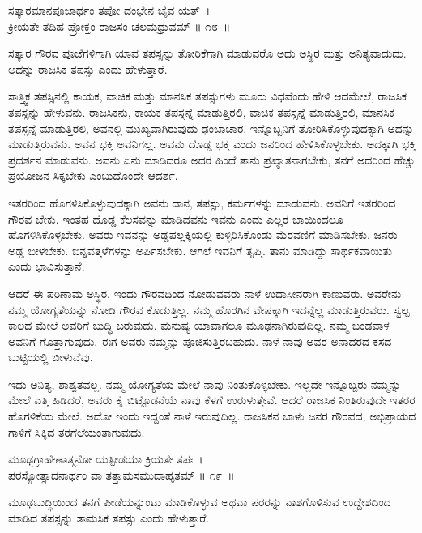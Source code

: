 \begin{shloka}
ಸತ್ಕಾರಮಾನಪೂಜಾರ್ಥಂ ತಪೋ ದಂಭೇನ ಚೈವ ಯತ್~।\\ಕ್ರೀಯತೇ ತದಿಹ ಪ್ರೋಕ್ತಂ ರಾಜಸಂ ಚಲಮಧ್ರುವಮ್ \hfill॥ ೧೮~॥
\end{shloka}

\begin{artha}
ಸತ್ಕಾರ ಗೌರವ ಪೂಜೆಗಳಿಗಾಗಿ ಯಾವ ತಪಸ್ಸನ್ನು ತೋರಿಕೆಗಾಗಿ ಮಾಡುವರೊ ಅದು ಅಸ್ಥಿರ ಮತ್ತು ಅನಿತ್ಯವಾದುದು. ಅದನ್ನು ರಾಜಸಿಕ ತಪಸ್ಸು ಎಂದು ಹೇಳುತ್ತಾರೆ.
\end{artha}

ಸಾತ್ತ್ವಿಕ ತಪಸ್ಸಿನಲ್ಲಿ ಕಾಯಕ, ವಾಚಿಕ ಮತ್ತು ಮಾನಸಿಕ ತಪಸ್ಸುಗಳು ಮೂರು ವಿಧವೆಂದು ಹೇಳಿ ಆದಮೇಲೆ, ರಾಜಸಿಕ ತಪಸ್ಸನ್ನು ಹೇಳುವನು. ರಾಜಸಿಕನು, ಕಾಯಕ ತಪಸ್ಸನ್ನೆ ಮಾಡುತ್ತಿರಲಿ, ವಾಚಿಕ ತಪಸ್ಸನ್ನೆ ಮಾಡುತ್ತಿರಲಿ, ಮಾನಸಿಕ ತಪಸ್ಸನ್ನೆ ಮಾಡುತ್ತಿರಲಿ, ಅವನಲ್ಲಿ ಮುಖ್ಯವಾಗಿರುವುದು ಢಂಬಾಚಾರ. ಇನ್ನೊಬ್ಬನಿಗೆ ತೋರಿಸಿಕೊಳ್ಳುವುದಕ್ಕಾಗಿ ಅದನ್ನು ಮಾಡು\-ತ್ತಿರುವನು. ಅವನ ಭಕ್ತಿ ಅವನಿಗಲ್ಲ. ಅವನು ದೊಡ್ಡ ಭಕ್ತ ಎಂದು ಜನರಿಂದ ಹೇಳಿಸಿಕೊಳ್ಳಬೇಕು. ಅದಕ್ಕಾಗಿ ಭಕ್ತಿ ಪ್ರದರ್ಶನ ಮಾಡುವನು. ಅವನು ಏನು ಮಾಡಿದರೂ ಅದರ ಹಿಂದೆ ತಾನು ಪ್ರಖ್ಯಾತನಾಗಬೇಕು, ತನಗೆ ಅದರಿಂದ ಹೆಚ್ಚು ಪ್ರಯೋಜನ ಸಿಕ್ಕಬೇಕು ಎಂಬುದೊಂದೇ ಆದರ್ಶ.

ಇತರರಿಂದ ಹೊಗಳಿಸಿಕೊಳ್ಳುವುದಕ್ಕಾಗಿ ಅವನು ದಾನ, ತಪಸ್ಸು, ಕರ್ಮಗಳನ್ನು ಮಾಡುವನು. ಅವನಿಗೆ ಇತರರಿಂದ ಗೌರವ ಬೇಕು. ಇಂತಹ ದೊಡ್ಡ ಕೆಲಸವನ್ನು ಮಾಡಿದವನು ಇವನು ಎಂದು ಎಲ್ಲರ ಬಾಯಿಂದಲೂ ಹೊಗಳಿಸಿಕೊಳ್ಳಬೇಕು. ಅವರು ಇವನನ್ನು ಅಡ್ಡಪಲ್ಲಕ್ಕಿಯಲ್ಲಿ ಕುಳ್ಳಿರಿಸಿಕೊಂಡು ಮೆರವಣಿಗೆ ಮಾಡಿಸಬೇಕು. ಜನರು ಅಡ್ಡ ಬೀಳಬೇಕು. ಬಿನ್ನವತ್ತಳೆಗಳನ್ನು ಅರ್ಪಿಸಬೇಕು. ಆಗಲೆ ಇವನಿಗೆ ತೃಪ್ತಿ. ತಾನು ಮಾಡಿದ್ದು ಸಾರ್ಥಕವಾಯಿತು ಎಂದು ಭಾವಿಸುತ್ತಾನೆ.

ಆದರೆ ಈ ಪರಿಣಾಮ ಅಸ್ಥಿರ. ಇಂದು ಗೌರವದಿಂದ ನೋಡುವವರು ನಾಳೆ ಉದಾಸೀನರಾಗಿ ಕಾಣುವರು. ಅವರೇನು ನಮ್ಮ ಯೋಗ್ಯತೆಯನ್ನು ನೋಡಿ ಗೌರವ ಕೊಡುತ್ತಿಲ್ಲ. ನಮ್ಮ ಹೊರಗಿನ ವೇಷಕ್ಕಾಗಿ ಇದನ್ನೆಲ್ಲ ಮಾಡುತ್ತಿರುವರು. ಸ್ವಲ್ಪ ಕಾಲದ ಮೇಲೆ ಅವರಿಗೆ ಬುದ್ಧಿ ಬರುವುದು. ಮನುಷ್ಯ ಯಾವಾಗಲೂ ಮೂಢನಾಗಿರುವುದಿಲ್ಲ. ನಮ್ಮ ಬಂಡವಾಳ ಅವನಿಗೆ ಗೊತ್ತಾಗುವುದು. ಈಗ ಅವರು ನಮ್ಮನ್ನು ಪೂಜಿಸುತ್ತಿರಬಹುದು. ನಾಳೆ ನಾವು ಅವರ ಅನಾದರದ ಕಸದ ಬುಟ್ಟಿಯಲ್ಲಿ ಬೀಳುವೆವು.

ಇದು ಅನಿತ್ಯ, ಶಾಶ್ವತವಲ್ಲ. ನಮ್ಮ ಯೋಗ್ಯತೆಯ ಮೇಲೆ ನಾವು ನಿಂತುಕೊಳ್ಳಬೇಕು. ಇಲ್ಲದೇ ಇನ್ನೊಬ್ಬರು ನಮ್ಮನ್ನು ಮೇಲೆ ಎತ್ತಿ ಹಿಡಿದರೆ, ಅವರು ಕೈ ಬಿಟ್ಟೊಡನೆಯೆ ನಾವು ಕೆಳಗೆ ಉರುಳುತ್ತೇವೆ. ಆದರೆ ರಾಜಸಿಕ ನಿಂತಿರುವುದೇ ಇತರರ ಹೊಗಳಿಕೆಯ ಮೇಲೆ. ಅದೋ ಇಂದು ಇದ್ದಂತೆ ನಾಳೆ ಇರುವುದಿಲ್ಲ. ರಾಜಸಿಕನ ಬಾಳು ಜನರ ಗೌರವದ, ಅಭಿಪ್ರಾಯದ ಗಾಳಿಗೆ ಸಿಕ್ಕಿದ ತರಗೆಲೆಯಂತಾಗುವುದು.

\begin{shloka}
ಮೂಢಗ್ರಾಹೇಣಾತ್ಮನೋ ಯತ್ಪೀಡಯಾ ಕ್ರಿಯತೇ ತಪಃ~।\\ಪರಸ್ಯೋತ್ಸಾದನಾರ್ಥಂ ವಾ ತತ್ತಾಮಸಮುದಾಹೃತಮ್ \hfill॥ ೧೯~॥
\end{shloka}

\begin{artha}
ಮೂಢಬುದ್ಧಿಯಿಂದ ತನಗೆ ಪೀಡೆಯನ್ನುಂಟು ಮಾಡಿಕೊಳ್ಳುವ ಅಥವಾ ಪರರನ್ನು ನಾಶಗೊಳಿಸುವ ಉದ್ದೇಶದಿಂದ ಮಾಡಿದ ತಪಸ್ಸನ್ನು ತಾಮಸಿಕ ತಪಸ್ಸು ಎಂದು ಹೇಳುತ್ತಾರೆ.
\end{artha}


